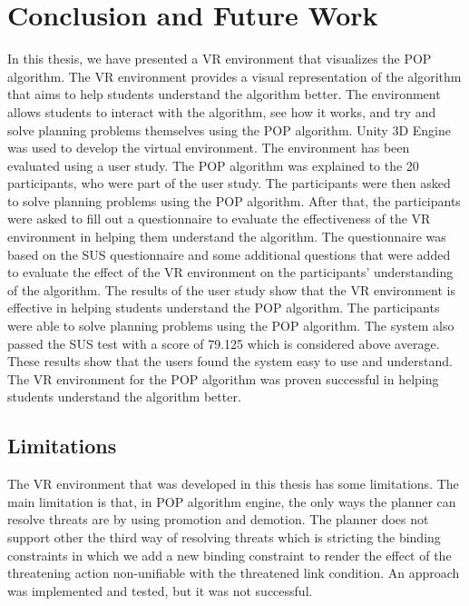 \chapter{Conclusion and Future Work}\label{chap:concl_future_work}


In this thesis, we have presented a \ac{VR} environment that visualizes the \ac{POP} algorithm. The \ac{VR} environment provides a visual representation of the algorithm that aims to help students understand the algorithm better. The environment allows students to interact with the algorithm, see how it works, and try and solve planning problems themselves using the \ac{POP} algorithm. Unity 3D Engine was used to develop the virtual environment. The environment has been evaluated using a user study. The \ac{POP} algorithm was explained to the 20 participants, who were part of the user study. The participants were then asked to solve planning problems using the \ac{POP} algorithm. After that, the participants were asked to fill out a questionnaire to evaluate the effectiveness of the \ac{VR} environment in helping them understand the algorithm. The questionnaire was based on the \ac{SUS} questionnaire and some additional questions that were added to evaluate the effect of the \ac{VR} environment on the participants' understanding of the algorithm. The results of the user study show that the \ac{VR} environment is effective in helping students understand the \ac{POP} algorithm. The participants were able to solve planning problems using the \ac{POP} algorithm. The system also passed the \ac{SUS} test with a score of 79.125 which is considered above average. These results show that the users found the system easy to use and understand. The \ac{VR} environment for the \ac{POP} algorithm was proven successful in helping students understand the algorithm better.

\section{Limitations}

The \ac{VR} environment that was developed in this thesis has some limitations. The main limitation is that, in \ac{POP} algorithm engine, the only ways the planner can resolve threats are by using promotion and demotion. The planner does not support other the third way of resolving threats which is stricting the binding constraints in which we add a new binding constraint to render the effect of the threatening action non-unifiable with the threatened link condition. An approach was implemented and tested, but it was not successful.


